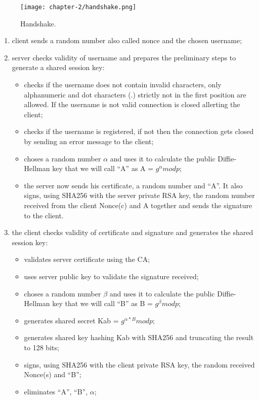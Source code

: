 \begin{figure}[!h] 
    \centering 
    \texttt{[image: chapter-2/handshake.png]} 
    \caption{Handshake.}
    \label{fig:handshake}
\end{figure}
\newpage{}
\begin{enumerate}
	\item client sends a random number also called nonce and the chosen username;
	\item server checks validity of username and prepares the preliminary steps to generate a shared session key:
	\begin{itemize}
		\item checks if the username does not contain invalid characters, only alphanumeric and dot characters (.) strictly not in the first position are allowed. If the username is not valid connection is closed allerting the client;
		\item checks if the username is registered, if not then the connection gets closed by sending an error message to the client;
		\item choses a random number \(\alpha\) and uses it to calculate the public Diffie-Hellman key that we will call ``A'' as A = \(g^\alpha mod p \);
		\item the server now sends his certificate, a random number and ``A''. It also signs, using SHA256 with the server private RSA key, the random number received from the client Nonce(c) and A together and sends the signature to the client.
	\end{itemize}
	\item the client checks validity of certificate and signature and generates the shared session key:
	\begin{itemize}
		\item validates server certificate using the CA;
		\item uses server public key to validate the signature received;
		\item choses a random number \(\beta\) and uses it to calculate the public Diffie-Hellman key that we will call ``B'' as B = \(g^\beta mod p \);
		\item generates shared secret Kab = \(g^{\alpha*B} mod p\);
		\item generates shared key hashing Kab with SHA256 and truncating the result to 128 bits;
		\item signs, using SHA256 with the client private RSA key, the random received Nonce(s) and ``B'';
		\item eliminates ``A'', ``B'', \(\alpha\);

\end{itemize}
\end{enumerate}
